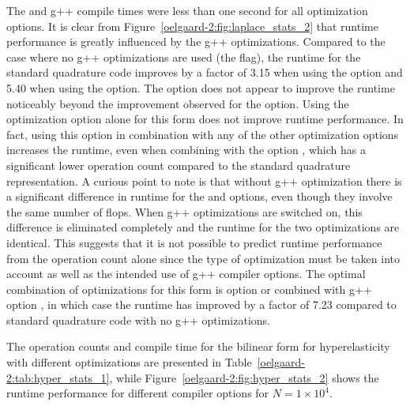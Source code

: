 The \ffc{} and g++ compile times were less than one second for all
optimization options.  It is clear from
Figure~\ref{oelgaard-2:fig:laplace_stats_2} that runtime performance
is greatly influenced by the g++ optimizations.  Compared to the case
where no g++ optimizations are used (the  flag), the runtime
for the standard quadrature code improves by a factor of 3.15 when
using the  option and 5.40 when using the  option.  The  option does not appear to
improve the runtime noticeably beyond the improvement observed for the
 option.  Using the \ffc{} optimization option
 alone for this form does not improve runtime performance.
In fact, using this option in combination with any of the other
optimization options increases the runtime, even when combining with
the option , which has a significant lower operation
count compared to the standard quadrature representation.  A curious
point to note is that without g++ optimization there is a significant
difference in runtime for the  and  options, even
though they involve the same number of flops.  When g++ optimizations
are switched on, this difference is eliminated completely and the
runtime for the two \ffc{} optimizations are identical.  This suggests
that it is not possible to predict runtime performance from the
operation count alone since the type of \ffc{} optimization must be
taken into account as well as the intended use of g++ compiler
options.  The optimal combination of optimizations for this form is
\ffc{} option  or  combined with g++ option
, in which case the runtime has improved by a
factor of 7.23 compared to standard quadrature code with no g++
optimizations.

The operation counts and \ffc{} compile time for the bilinear form for
hyperelasticity with different \ffc{} optimizations are presented in
Table~\ref{oelgaard-2:tab:hyper_stats_1}, while
Figure~\ref{oelgaard-2:fig:hyper_stats_2} shows the runtime
performance for different compiler options for $N = 1 \times 10^4$.

